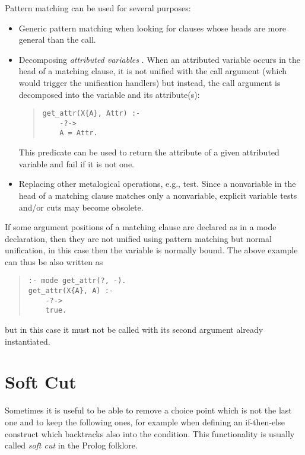 Pattern matching can be used for several purposes:
\begin{itemize}
\item Generic pattern matching when looking for clauses
whose heads are more general than the call.

\item Decomposing {\it attributed variables} \cite{eclipseext}.
When an attributed variable occurs in the head of a matching clause,
it is not unified with the call argument (which would trigger
the unification handlers) but instead, the call argument
is decomposed into the variable and its attribute(s):
\begin{quote}
\begin{verbatim}
get_attr(X{A}, Attr) :-
    -?->
    A = Attr.
\end{verbatim}
\end{quote}
This predicate can be used to return the attribute of a given
attributed variable and fail if it is not one.

\item Replacing other metalogical operations,
e.g., 
test. Since a nonvariable in the head of a matching clause
matches only a nonvariable, explicit variable tests and/or cuts
may become obsolete.
\end{itemize}

If some argument positions of a matching clause are declared
as  in a mode declaration, then they are not
unified using pattern matching but normal unification,
in this case then the variable is normally bound.
The above example can thus be also written as
\begin{quote}
\begin{verbatim}
:- mode get_attr(?, -).
get_attr(X{A}, A) :-
    -?->
    true.
\end{verbatim}
\end{quote}
but in this case it must not be called with its second argument
already instantiated.


\section{Soft Cut}
Sometimes it is useful to be able to remove a choice point which is
not the last one and to keep the following ones, for example
when defining an if-then-else construct which backtracks also
into the condition.
This functionality is usually called {\it soft cut} in the Prolog
folklore.

